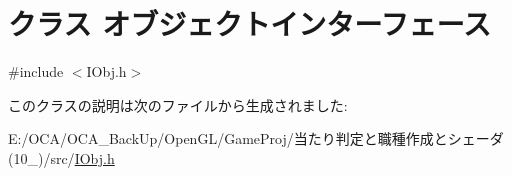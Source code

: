 \hypertarget{class_xE3_x82_xAA_xE3_x83_x96_xE3_x82_xB8_xE3_x82_xA7_xE3_x82_xAF_xE3_x83_x88_xE3_x82_xA4_xE3_x8b96d20a3af809279c7b3d794e4dacae1}{\section{クラス オブジェクトインターフェース}
\label{class_xE3_x82_xAA_xE3_x83_x96_xE3_x82_xB8_xE3_x82_xA7_xE3_x82_xAF_xE3_x83_x88_xE3_x82_xA4_xE3_x8b96d20a3af809279c7b3d794e4dacae1}
}


{\ttfamily \#include $<$I\-Obj.\-h$>$}



このクラスの説明は次のファイルから生成されました\-:\begin{DoxyCompactItemize}
\item 
E\-:/\-O\-C\-A/\-O\-C\-A\-\_\-\-Back\-Up/\-Open\-G\-L/\-Game\-Proj/当たり判定と職種作成とシェーダ(10\-\_)/src/\hyperlink{_i_obj_8h}{I\-Obj.\-h}\end{DoxyCompactItemize}

